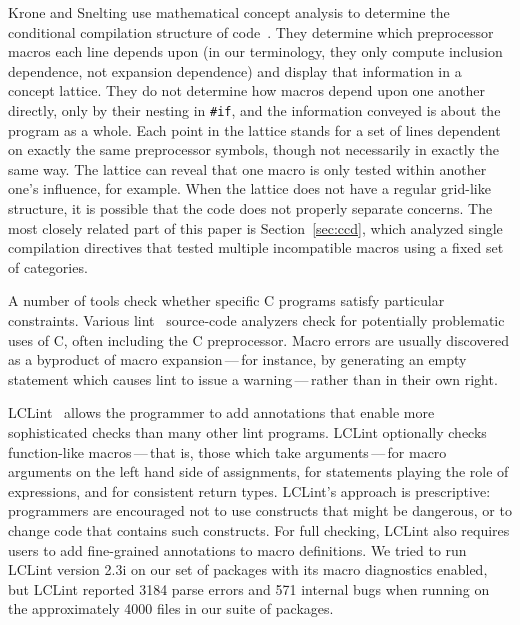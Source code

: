 \documentclass[10pt]{article}
\begin{document}
Krone and Snelting use mathematical concept analysis to determine the
conditional compilation structure of code~\cite{Krone94}.  They determine
which preprocessor macros each line depends upon (in our terminology, they
only compute inclusion dependence, not expansion dependence) and display
that information in a concept lattice.  They do not determine how macros
depend upon one another directly, only by their nesting in {\tt \#if}, and
the information conveyed is about the program as a whole.  Each point in
the lattice stands for a set of lines dependent on exactly the same
preprocessor symbols, though not necessarily in exactly the same way.  The
lattice can reveal that one macro is only tested within another one's
influence, for example.  When the lattice does not have a regular grid-like
structure, it is possible that the code does not properly separate
concerns.  The most closely related part of this paper is
Section~\ref{sec:ccd}, which analyzed single compilation directives that
tested multiple incompatible macros using a fixed set of categories.



A number of tools check whether specific C programs satisfy particular
constraints.  Various lint~\cite{Johnson77} source-code analyzers check
for potentially problematic uses of C, often including the C preprocessor.
Macro errors are usually discovered as a byproduct of macro
expansion\,---\,for instance, by generating an empty statement which causes
lint to issue a warning\,---\,rather than in their own right.

LCLint~\cite{Evans-fse94,Evans:LCLint} allows the programmer to add
annotations that enable more sophisticated checks than many other lint
programs.  LCLint optionally checks function-like macros\,---\,that is,
those which take arguments\,---\,for macro arguments on the left hand side
of assignments, for statements playing the role of expressions, and for
consistent return types.  LCLint's approach is prescriptive:  programmers
are encouraged not to use constructs that might be dangerous, or to change
code that contains such constructs.  For full checking, LCLint also
requires users to add fine-grained annotations to macro definitions.  We
tried to run LCLint version 2.3i on our set of packages with its macro diagnostics
enabled, but LCLint reported 3184 parse errors and 571 internal bugs when
running on the approximately 4000 files in our suite of packages.
\end{document}
